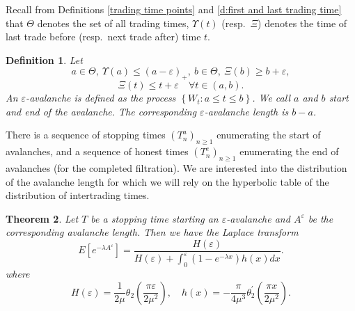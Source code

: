 \documentclass[11pt]{scrartcl}
\newtheorem{theorem}{Theorem}
\newtheorem{definition}[theorem]{Definition}
\begin{document}
Recall from Definitions \ref{trading time points} and \ref{d:first and last trading time} that $\Theta$ denotes the set of all trading times, $\Upsilon(t)$ (resp.\ $\Xi$) denotes the time of last trade before (resp.\ next trade after) time $t$.

\begin{definition}
Let
\begin{equation}
a\in \Theta ,~\Upsilon (a)\leq (a-\varepsilon )_{+},~b\in \Theta ,~\Xi
(b)\geq b+\varepsilon ,
\end{equation}
\begin{equation}
\Xi (t)\leq t+\varepsilon \quad \forall t\in (a,b).
\end{equation}
An $\varepsilon $-\emph{avalanche }is defined as the process $\left\{
W_{t}:a\leq t\leq b\right\} $. We call $a$ and $b$ start and end of the
avalanche. The corresponding $\varepsilon $\emph{-avalanche length} is $b-a$.
\end{definition}

There is a sequence of stopping times $(T_{n}^{a})_{n\geq 1}$ enumerating
the start of avalanches, and a sequence of honest times $(T_{n}^{e})_{n\geq
1}$ enumerating the end of avalanches (for the completed filtration). We are interested into the distribution of the avalanche length for which we
will rely on the hyperbolic table of the distribution of intertrading times.
\begin{theorem}
Let $T$ be a stopping time starting an $\varepsilon$-avalanche and $A^\varepsilon$ be the corresponding avalanche length. Then we have the
Laplace transform 
\begin{equation}
E\left[ e^{-\lambda A^{\varepsilon}}\right]= \frac{H(\varepsilon)}{H(\varepsilon)+\int_0^\varepsilon(1-e^{-\lambda x})h(x)dx}.
\label{L-trafo full avalanche length}
\end{equation}
where 
\begin{equation}
H(\varepsilon)=\frac1{2\mu}\theta_2\left(\frac{\pi\varepsilon}{2\mu^2}\right), \quad h(x)=-\frac{\pi}{4\mu^3}\theta_2^{\prime }\left(\frac{\pi x}{2\mu^2}\right).
\end{equation}
\end{theorem}
\end{document}

